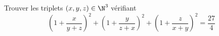 Trouver les triplets $(x, y, z) \in \N^3$ vérifiant
$$\left(1 + \frac{x}{y + z}\right)^2 + \left(1 + \frac{y}{z + x}\right)^2 + \left(1 + \frac{z}{x + y}\right)^2 = \frac{27}{4}$$